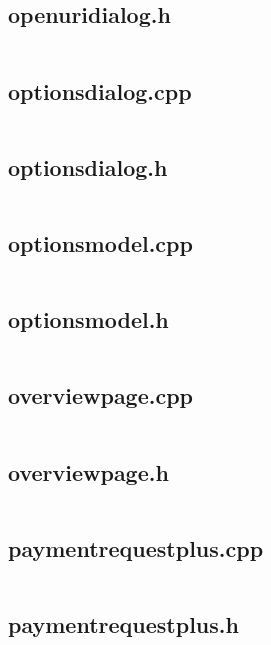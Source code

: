 \documentclass{article}
\begin{document}
\subsection{openuridialog.h}
\inputminted{cpp}{/home/dufferzafar/dev/@clones/bitcoin/src/qt/openuridialog.h}
\newpage

\subsection{optionsdialog.cpp}
\inputminted{cpp}{/home/dufferzafar/dev/@clones/bitcoin/src/qt/optionsdialog.cpp}
\newpage

\subsection{optionsdialog.h}
\inputminted{cpp}{/home/dufferzafar/dev/@clones/bitcoin/src/qt/optionsdialog.h}
\newpage

\subsection{optionsmodel.cpp}
\inputminted{cpp}{/home/dufferzafar/dev/@clones/bitcoin/src/qt/optionsmodel.cpp}
\newpage

\subsection{optionsmodel.h}
\inputminted{cpp}{/home/dufferzafar/dev/@clones/bitcoin/src/qt/optionsmodel.h}
\newpage

\subsection{overviewpage.cpp}
\inputminted{cpp}{/home/dufferzafar/dev/@clones/bitcoin/src/qt/overviewpage.cpp}
\newpage

\subsection{overviewpage.h}
\inputminted{cpp}{/home/dufferzafar/dev/@clones/bitcoin/src/qt/overviewpage.h}
\newpage

\subsection{paymentrequestplus.cpp}
\inputminted{cpp}{/home/dufferzafar/dev/@clones/bitcoin/src/qt/paymentrequestplus.cpp}
\newpage

\subsection{paymentrequestplus.h}
\inputminted{cpp}{/home/dufferzafar/dev/@clones/bitcoin/src/qt/paymentrequestplus.h}
\newpage
\end{document}
